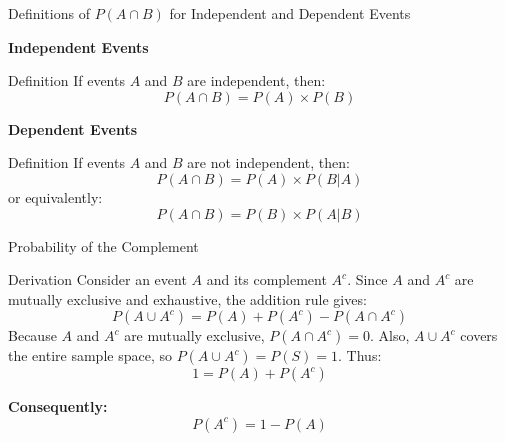 \documentclass[handout]{beamer} %
\begin{document}
\begin{frame}{Definitions of \(P(A \cap B)\) for Independent and Dependent Events}

    \begin{minipage}[t]{0.45\textwidth}
        \centering
        \textbf{Independent Events}\pause
        \begin{block}{Definition}
            If events \(A\) and \(B\) are independent, then:\pause
            \[
            P(A \cap B) = P(A) \times P(B)
            \]\pause
        \end{block}
    \end{minipage}
    \hfill
    \begin{minipage}[t]{0.45\textwidth}
        \centering
        \textbf{Dependent Events}\pause
        \begin{block}{Definition}
            If events \(A\) and \(B\) are not independent, then:\pause
            \[
            P(A \cap B) = P(A) \times P(B|A)
            \]\pause
            or equivalently:
            \[
            P(A \cap B) = P(B) \times P(A|B)
            \]
        \end{block}
    \end{minipage}

\end{frame}

\begin{frame}{Probability of the Complement}  

    \begin{block}{Derivation}
        Consider an event \(A\) and its complement \(A^c\). Since \(A\) and \(A^c\) are mutually exclusive and exhaustive, the addition rule gives:\pause
        \[
        P(A \cup A^c) = P(A) + P(A^c) - P(A \cap A^c)
        \]\pause
        Because \(A\) and \(A^c\) are mutually exclusive, \(P(A \cap A^c) = 0\). \pause Also, \(A \cup A^c\) covers the entire sample space, so \(P(A \cup A^c) = P(S) = 1\). \pause Thus:
        \[
        1 = P(A) + P(A^c)
        \] \pause
    \end{block}
    \pause
    \textbf{Consequently:}
    \[
    P(A^c) = 1 - P(A)
    \]
\end{frame}
\end{document}
